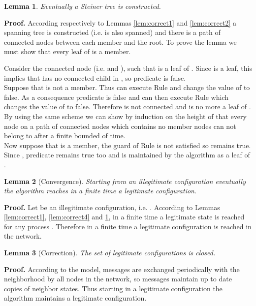 \documentclass[11pt]{article}
\newtheorem{lemma}{Lemma}
\newenvironment{proof}{\noindent \begin{rm}{\textbf{Proof.} }}{\hspace*{\fill}\par\end{rm} \vspace{.3cm}}
\newcommand{\CRC}{}
\newcommand{\CRE}{}
\begin{document}
\begin{lemma}
\label{lem:correct5}
Eventually a Steiner tree is constructed.
\end{lemma}

\begin{proof}
According respectively to Lemmas \ref{lem:correct1} and
\ref{lem:correct2} a spanning tree is constructed (i.e.  is also
spanned) and there is a path of connected nodes between each member
and the root. To prove the lemma we must show that every leaf of 
is a member.

Consider the connected node  (i.e.  and
), such that  is a leaf of . Since  is a
leaf, this implies that  has no connected child in , so
predicate  is false.\\ Suppose that  is not a
member. Thus  can execute Rule \CRC\/ and change the value of
 to false. As a consequence predicate 
is false and  can then execute Rule \CRE\/ which changes the value of
 to false. Therefore  is not connected and is no more
a leaf of . By using the same scheme we can show by induction on
the height of  that every node on a path of connected nodes which
contains no member nodes can not belong to  after a finite bounded
of time.\\ Now suppose that  is a member, the guard of Rule \CRC\/ is
not satisfied so  remains true. Since , predicate
 remains true too and  is maintained by the
algorithm as a leaf of .
\end{proof}

\begin{lemma}[Convergence]
\label{lem:convergence}
Starting from an illegitimate configuration eventually the algorithm reaches in a finite time a legitimate
configuration.
\end{lemma}

\begin{proof}
Let  be an illegitimate configuration, i.e. . According to Lemmas \ref{lem:correct1},
\ref{lem:correct4} and \ref{lem:correct5}, in a finite time a
legitimate state is reached for any process . Therefore in a
finite time a legitimate configuration is reached in the network.
\end{proof}

\begin{lemma}[Correction]
The set of legitimate configurations is closed.
\end{lemma}

\begin{proof}
According to the model,  messages are exchanged periodically
with the neighborhood by all nodes in the network, so 
messages maintain up to date copies of neighbor states. Thus starting
in a legitimate configuration the algorithm maintains a legitimate
configuration.
\end{proof}
\end{document}
